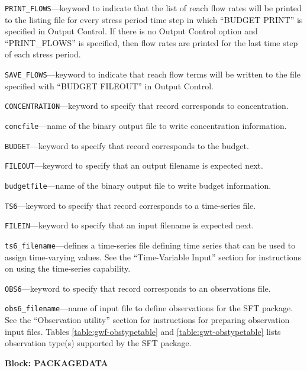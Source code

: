 \begin{description}
\item \texttt{PRINT\_FLOWS}---keyword to indicate that the list of reach flow rates will be printed to the listing file for every stress period time step in which ``BUDGET PRINT'' is specified in Output Control.  If there is no Output Control option and ``PRINT\_FLOWS'' is specified, then flow rates are printed for the last time step of each stress period.

\item \texttt{SAVE\_FLOWS}---keyword to indicate that reach flow terms will be written to the file specified with ``BUDGET FILEOUT'' in Output Control.

\item \texttt{CONCENTRATION}---keyword to specify that record corresponds to concentration.

\item \texttt{concfile}---name of the binary output file to write concentration information.

\item \texttt{BUDGET}---keyword to specify that record corresponds to the budget.

\item \texttt{FILEOUT}---keyword to specify that an output filename is expected next.

\item \texttt{budgetfile}---name of the binary output file to write budget information.

\item \texttt{TS6}---keyword to specify that record corresponds to a time-series file.

\item \texttt{FILEIN}---keyword to specify that an input filename is expected next.

\item \texttt{ts6\_filename}---defines a time-series file defining time series that can be used to assign time-varying values. See the ``Time-Variable Input'' section for instructions on using the time-series capability.

\item \texttt{OBS6}---keyword to specify that record corresponds to an observations file.

\item \texttt{obs6\_filename}---name of input file to define observations for the SFT package. See the ``Observation utility'' section for instructions for preparing observation input files. Tables \ref{table:gwf-obstypetable} and \ref{table:gwt-obstypetable} lists observation type(s) supported by the SFT package.

\end{description}
\item \textbf{Block: PACKAGEDATA}


